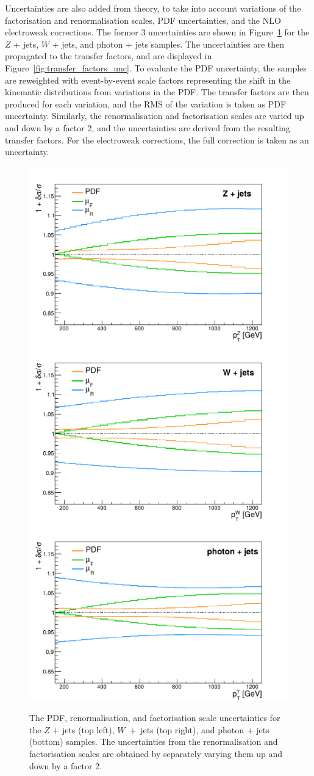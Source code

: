 Uncertainties are also added from theory, to take into account variations of the factorisation and renormalisation scales, PDF uncertainties, and the NLO electroweak corrections. The former 3 uncertainties are shown in Figure~\ref{fig:kfactors_unc} for the $Z$ + jets, $W$ + jets, and photon + jets samples. The  uncertainties are then propagated to the transfer factors, and are displayed in Figure~\ref{fig:transfer_factors_unc}. To evaluate the PDF uncertainty, the samples are reweighted with event-by-event scale factors representing the shift in the kinematic distributions from variations in the PDF. The transfer factors are then produced for each variation, and the RMS of the variation is taken as PDF uncertainty. Similarly, the renormalisation and factorisation scales are varied up and down by a factor 2, and the uncertainties are derived from the resulting transfer factors. For the electroweak corrections, the full correction is taken as an uncertainty.

\begin{figure}[ht]
  \centering
 \includegraphics[width=.49\textwidth]{Z_uncertainties_smooth.pdf} 
 \includegraphics[width=.49\textwidth]{W_uncertainties_smooth_new.pdf} \\
 \includegraphics[width=.49\textwidth]{gamma_uncertainties_smooth.pdf} 
 \caption{The PDF, renormalisation, and factorisation scale uncertainties for the $Z$ + jets (top left), $W$~+~jets (top right), and photon + jets (bottom) samples. The uncertainties from the renormalisation and factorisation scales are obtained by separately varying them up and down by a factor 2.}
 \label{fig:kfactors_unc}
\end{figure}

